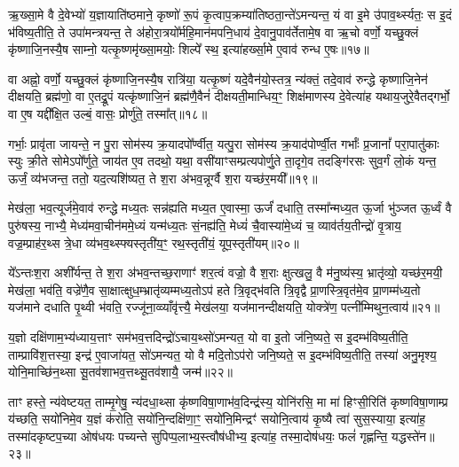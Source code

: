 ऋ॒ख्सा॒मे वै दे॒वेभ्यो॑ य॒ज्ञायाति॑ष्ठमाने॒ कृष्णो॑ रू॒पं कृ॒त्वाप॒क्रम्या॑तिष्ठता॒न्ते॑\-ऽमन्यन्त॒ यं वा इ॒मे उ॑पाव॒र्थ्स्यतः॒ स इ॒दं भ॑विष्य॒तीति॒ ते उपा॑मन्त्रयन्त॒ ते अ॑होरा॒त्रयो᳚र्महि॒मान॑मपनि॒धाय॑ दे॒वानु॒पाव॑र्तेतामे॒ष वा ऋ॒चो वर्णो॒ यच्छु॒क्लं कृ॑ष्णाजि॒नस्यै॒ष साम्नो॒ यत्कृ॒ष्णमृ॑ख्सा॒मयोः॒ शिल्पे᳚ स्थ॒ इत्या॑हर्ख्सा॒मे ए॒वाव॑ रुन्ध ए॒षः॥१७॥

वा अह्नो॒ वर्णो॒ यच्छु॒क्लं कृ॑ष्णाजि॒नस्यै॒ष रात्रि॑या॒ यत्कृ॒ष्णं यदे॒वैन॑यो॒स्तत्र॒ न्य॑क्तं॒ तदे॒वाव॑ रुन्द्धे कृष्णाजि॒नेन॑ दीक्षयति॒ ब्रह्म॑णो॒ वा ए॒तद्रू॒पं यत्कृ॑ष्णाजि॒नं ब्रह्म॑णै॒वैनं॑ दीक्षयती॒मान्धिय॒ꣳ॒ शिक्ष॑माणस्य दे॒वेत्या॑ह यथाय॒जुरे॒वैतद्गर्भो॒ वा ए॒ष यद्दी᳚क्षि॒त उल्बं॒ वासः॒ प्रोर्णु॑ते॒ तस्मा᳚त्॥१८॥

गर्भाः॒ प्रावृ॑ता जायन्ते॒ न पु॒रा सोम॑स्य क्र॒यादपो᳚र्ण्वीत॒ यत्पु॒रा सोम॑स्य क्र॒याद॑पोर्ण्वी॒त गर्भाः᳚ प्र॒जानां᳚ परा॒पातु॑काः स्युः क्री॒ते सोमे\-ऽपो᳚र्णुते॒ जाय॑त ए॒व तदथो॒ यथा॒ वसी॑याꣳसम्प्रत्यपोर्णु॒ते ता॒दृगे॒व तदङ्गि॑रसः सुव॒र्गं लो॒कं यन्त॒ ऊर्जं॒ व्य॑भजन्त॒ ततो॒ यद॒त्यशि॑ष्यत॒ ते श॒रा अ॑भव॒न्नूर्ग्वै श॒रा यच्छ॑र॒मयी᳚॥१९॥

मेख॑ला॒ भव॒त्यूर्ज॑मे॒वाव॑ रुन्द्धे मध्य॒तः सन्न॑ह्यति मध्य॒त ए॒वास्मा॒ ऊर्जं॑ दधाति॒ तस्मा᳚न्मध्य॒त ऊ॒र्जा भु॑ञ्जत ऊ॒र्ध्वं वै पुरु॑षस्य॒ नाभ्यै॒ मेध्य॑मवा॒चीन॑ममे॒ध्यं यन्म॑ध्य॒तः सं॒नह्य॑ति॒ मेध्यं॑ चै॒वास्या॑मे॒ध्यं च॒ व्याव॑र्तय॒तीन्द्रो॑ वृ॒त्राय॒ वज्र॒म्प्राह॑र॒थ्स त्रे॒धा व्य॑भव॒थ्स्फ्यस्तृती॑य॒ꣳ॒ रथ॒स्तृती॑यं॒ यूप॒स्तृती॑यम्॥२०॥

ये᳚\-ऽन्तःश॒रा अशी᳚र्यन्त॒ ते श॒रा अ॑भव॒न्तच्छ॒राणाꣳ॑ शर॒त्वं वज्रो॒ वै श॒राः क्षुत्खलु॒ वै म॑नु॒ष्य॑स्य॒ भ्रातृ॑व्यो॒ यच्छ॑र॒मयी॒ मेख॑ला॒ भव॑ति॒ वज्रे॑णै॒व सा॒क्षात्क्षुध॒म्भ्रातृ॑व्यम्मध्य॒तो\-ऽप॑ हते त्रि॒वृद्भ॑वति त्रि॒वृद्वै प्रा॒णस्त्रि॒वृत॑मे॒व प्रा॒णम्म॑ध्य॒तो यज॑माने दधाति पृ॒थ्वी भ॑वति॒ रज्जू॑ना॒व्व्याँवृ॑त्त्यै॒ मेख॑लया॒ यज॑मानन्दीक्षयति॒ योक्त्रे॑ण॒ पत्नी᳚म्मिथुन॒त्वाय॑॥२१॥

य॒ज्ञो दक्षि॑णाम॒भ्य॑ध्याय॒त्ताꣳ सम॑भव॒त्तदिन्द्रो॑\-ऽचाय॒थ्सो॑\-ऽमन्यत॒ यो वा इ॒तो ज॑नि॒ष्यते॒ स इ॒दम्भ॑विष्य॒तीति॒ ताम्प्रावि॑श॒त्तस्या॒ इन्द्र॑ ए॒वाजा॑यत॒ सो॑\-ऽमन्यत॒ यो वै मदि॒तो\-ऽप॑रो जनि॒ष्यते॒ स इ॒दम्भ॑विष्य॒तीति॒ तस्या॑ अनु॒मृश्य॒ योनि॒माच्छि॑न॒थ्सा सू॒तव॑शाभव॒त्तथ्सू॒तव॑शायै॒ जन्म॑॥२२॥

ताꣳ हस्ते॒ न्य॑वेष्टयत॒ ताम्मृ॒गेषु॒ न्य॑दधा॒थ्सा कृ॑ष्णविषा॒णाभ॑व॒दिन्द्र॑स्य॒ योनि॑रसि॒ मा मा॑ हिꣳसी॒रिति॑ कृष्णविषा॒णाम्प्र य॑च्छति॒ सयो॑निमे॒व य॒ज्ञं क॑रोति॒ सयो॑नि॒न्दक्षि॑णा॒ꣳ॒ सयो॑नि॒मिन्द्रꣳ॑ सयोनि॒त्वाय॑ कृ॒ष्यै त्वा॑ सुस॒स्याया॒ इत्या॑ह॒ तस्मा॑दकृष्टप॒च्या ओष॑धयः पच्यन्ते सुपिप्प॒लाभ्य॒स्त्वौष॑धीभ्य॒ इत्या॑ह॒ तस्मा॒दोष॑धयः॒ फलं॑ गृह्णन्ति॒ यद्धस्ते॑न॥२३॥

